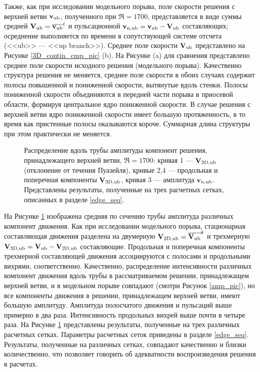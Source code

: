 Также, как при исследовании модельного порыва, поле скорости решения с верхней ветви $\mathbf{v}_\mathrm{ub}$, полученного при $\Re = 1700$, представляется в виде суммы средней $\mathbf{V}_\mathrm{ub} = \overline{\mathbf{v}_\mathrm{ub}}^t$ и пульсационной $\mathbf{v}_\mathrm{n,ub} = \mathbf{v}_\mathrm{ub} - \mathbf{V}_\mathrm{ub}$ составляющих; осреднение выполняется по времени в сопутствующей системе отсчета (<<ub>> --- <<up branch>>). Среднее поле скорости $\mathbf{V}_\mathrm{ub}$ представлено на Рисунке \ref{3D_contin_cmp_pic} (b). На Рисунке (a) для сравнения представлено среднее поле скорости исходного решения (модельного порыва). Качественно структура решения не меняется, среднее поле скорости в обоих случаях содержит полосы повышенной и пониженной скорости, вытянутые вдоль стенки. Полосы пониженной скорости объединяются в передней части порыва в приосевой области, формируя центральное ядро пониженной скорости. В случае решения с верхней ветви ядро пониженной скорости имеет большую протяженность, в то время как пристенные полосы оказываются короче. Суммарная длина структуры при этом практически не меняется. 


\begin{figure}
\caption{Распределение вдоль трубы амплитуды компонент решения, принадлежащего верхней ветви, $\Re = 1700$: кривая 1 --- $\mathbf{V}_\mathrm{2D,ub}$ (отклонение от течения Пуазейля), кривые 2,4 --- продольная и поперечная компоненты $\mathbf{V}_\mathrm{3D,ub}$, кривая 3 --- амплитуда $\mathbf{v}_\mathrm{n,ub}$. Представлены результаты, полученные на трех расчетных сетках, описанных в разделе \ref{edge_seq}.}
\label{amp_ub_pic}
\end{figure}


На Рисунке \ref{amp_ub_pic} изображена средняя по сечению трубы амплитуда различных компонент движения. Как при исследовании модельного порыва, стационарная составляющая движения разделена на двумерную $\mathbf{V}_\mathrm{2D,ub} = \overline{\mathbf{V}_\mathrm{ub}}^{\theta}$ и трехмерную $\mathbf{V}_\mathrm{3D,ub} = \mathbf{V}_\mathrm{ub} - \mathbf{V}_\mathrm{2D,ub}$ составляющие. Продольная и поперечная компоненты трехмерной составляющей движения ассоциируются с полосами и продольными вихрями, соответственно. Качественно, распределение интенсивности различных компонент движения вдоль трубы в рассматриваемом решении, принадлежащем верхней ветви, и в модельном порыве совпадают (смотри Рисунок \ref{amp_pic}), но все компоненты движения в решении, принадлежащем верхней ветви, имеют большую амплитуду. Амплитуда полосчатого движения и пульсаций выше примерно в два раза. Интенсивность продольных вихрей выше почти в четыре раза. На Рисунке \ref{amp_ub_pic} представлены результаты, полученные на трех различных расчетных сетках. Параметры расчетных сеток приведены в разделе \ref{edge_seq}. Результаты, полученные на различных сетках, совпадают качественно и близки количественно, что позволяет говорить об адекватности воспроизведения решения в расчетах. 


